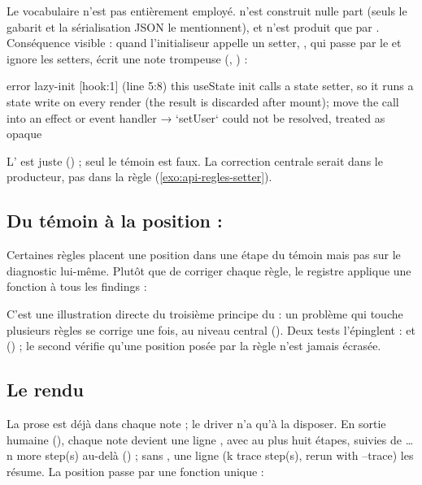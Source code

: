 \begin{piege}
Le vocabulaire n'est pas entièrement employé.  n'est construit nulle part (seuls le gabarit et la sérialisation JSON le mentionnent), et  n'est produit que par . Conséquence visible : quand l'initialiseur appelle un setter, , qui passe par le  et ignore les setters, écrit une note trompeuse (, ) :
\begin{sortie}
    error  lazy-init  [hook:1]  (line 5:8)  this useState init calls a state setter, so it runs a state write on every render (the result is discarded after mount); move the call into an effect or event handler
       → `setUser` could not be resolved, treated as opaque
\end{sortie}
L'\Error{} est juste () ; seul le témoin est faux. La correction centrale serait dans le producteur, pas dans la règle (\cref{exo:api-regles-setter}).
\end{piege}

\subsection{Du témoin à la position : }

Certaines règles placent une position dans une étape du témoin mais pas sur le diagnostic lui-même. Plutôt que de corriger chaque règle, le registre applique une fonction à tous les findings :


C'est une illustration directe du troisième principe du  : un problème qui touche plusieurs règles se corrige une fois, au niveau central (). Deux tests l'épinglent :  et  () ; le second vérifie qu'une position posée par la règle n'est jamais écrasée.

\subsection{Le rendu}

La prose est déjà dans chaque note ; le driver n'a qu'à la disposer. En sortie humaine (), chaque note devient une ligne , avec au plus huit étapes, suivies de \og … n more step(s)\fg{} au-delà () ; sans , une ligne \og (k trace step(s), rerun with --trace)\fg{} les résume. La position passe par une fonction unique :

